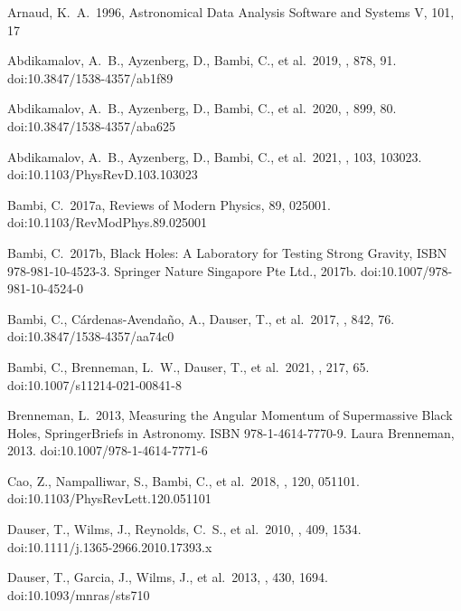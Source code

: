 \documentclass[twocolumn]{emulateapj}
\begin{document}





\begin{thebibliography}{99}

 Arnaud, K.~A.\ 1996, Astronomical Data Analysis Software and Systems V, 101, 17

 Abdikamalov, A.~B., Ayzenberg, D., Bambi, C., et al.\ 2019, \apj, 878, 91. doi:10.3847/1538-4357/ab1f89

 Abdikamalov, A.~B., Ayzenberg, D., Bambi, C., et al.\ 2020, \apj, 899, 80. doi:10.3847/1538-4357/aba625

 Abdikamalov, A.~B., Ayzenberg, D., Bambi, C., et al.\ 2021, \prd, 103, 103023. doi:10.1103/PhysRevD.103.103023

 Bambi, C.\ 2017a, Reviews of Modern Physics, 89, 025001. doi:10.1103/RevModPhys.89.025001

 Bambi, C.\ 2017b, Black Holes: A Laboratory for Testing Strong Gravity, ISBN 978-981-10-4523-3. Springer Nature Singapore Pte Ltd., 2017b. doi:10.1007/978-981-10-4524-0

 Bambi, C., C{\'a}rdenas-Avenda{\~n}o, A., Dauser, T., et al.\ 2017, \apj, 842, 76. doi:10.3847/1538-4357/aa74c0

 Bambi, C., Brenneman, L.~W., Dauser, T., et al.\ 2021, \ssr, 217, 65. doi:10.1007/s11214-021-00841-8

 Brenneman, L.\ 2013, Measuring the Angular Momentum of Supermassive Black Holes, SpringerBriefs in Astronomy. ISBN 978-1-4614-7770-9. Laura Brenneman, 2013. doi:10.1007/978-1-4614-7771-6

 Cao, Z., Nampalliwar, S., Bambi, C., et al.\ 2018, \prl, 120, 051101. doi:10.1103/PhysRevLett.120.051101

 Dauser, T., Wilms, J., Reynolds, C.~S., et al.\ 2010, \mnras, 409, 1534. doi:10.1111/j.1365-2966.2010.17393.x

 Dauser, T., Garcia, J., Wilms, J., et al.\ 2013, \mnras, 430, 1694. doi:10.1093/mnras/sts710


\end{thebibliography}
\end{document}
